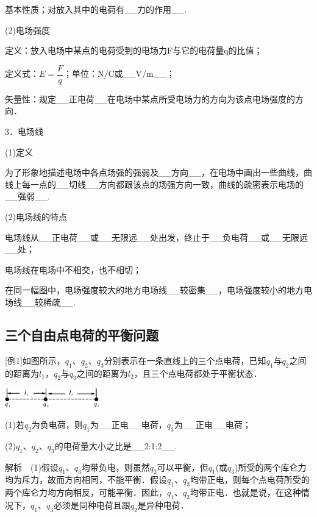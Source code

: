 \documentclass[cn,10.5pt,chinese,mac,chinesefont=founder]{elegantbook}
\begin{document}
基本性质；对放入其中的电荷有\_\_力的作用\_\_.

(2)电场强度

定义：放入电场中某点的电荷受到的电场力F与它的电荷量q的比值；

定义式：$E=\dfrac{F}{q}$；单位：N/C或\_\_V/m\_\_；

矢量性：规定\_\_正电荷\_\_在电场中某点所受电场力的方向为该点电场强度的方向．

3．电场线

(1)定义

为了形象地描述电场中各点场强的强弱及\_\_方向\_\_，在电场中画出一些曲线，曲线上每一点的\_\_切线\_\_方向都跟该点的场强方向一致，曲线的疏密表示电场的\_\_强弱\_\_.

(2)电场线的特点

电场线从\_\_正电荷\_\_或\_\_无限远\_\_处出发，终止于\_\_负电荷\_\_或\_\_无限远\_\_处；

电场线在电场中不相交，也不相切；

在同一幅图中，电场强度较大的地方电场线\_\_较密集\_\_，电场强度较小的地方电场线\_\_较稀疏\_\_.

\newpage


\subsection{三个自由点电荷的平衡问题}

{[}例1{]}如图所示，$q_1$、$q_2$、$q_3$分别表示在一条直线上的三个点电荷，已知$q_1$与$q_2$之间的距离为$l_1$，$q_2$与$q_3$之间的距离为$l_2$，且三个点电荷都处于平衡状态．

\begin{center}\includegraphics[width=1.60417in,height=0.32292in]{media/image260.png}\end{center}

(1)若$q_2$为负电荷，则$q_1$为\_\_正电\_\_电荷，$q_3$为\_\_正电\_\_电荷；

(2)$q_1$、$q_2$、$q_3$的电荷量大小之比是\_\_2:1:2\_\_.

解析　(1)假设$q_1$、$q_3$均带负电，则虽然$q_2$可以平衡，但$q_1$(或$q_3$)所受的两个库仑力均为斥力，故而方向相同，不能平衡．假设$q_1$、$q_3$均带正电，则每个点电荷所受的两个库仑力均方向相反，可能平衡．因此，$q_1$、$q_3$均带正电．也就是说，在这种情况下，$q_1$、$q_3$必须是同种电荷且跟$q_2$是异种电荷．
\end{document}

